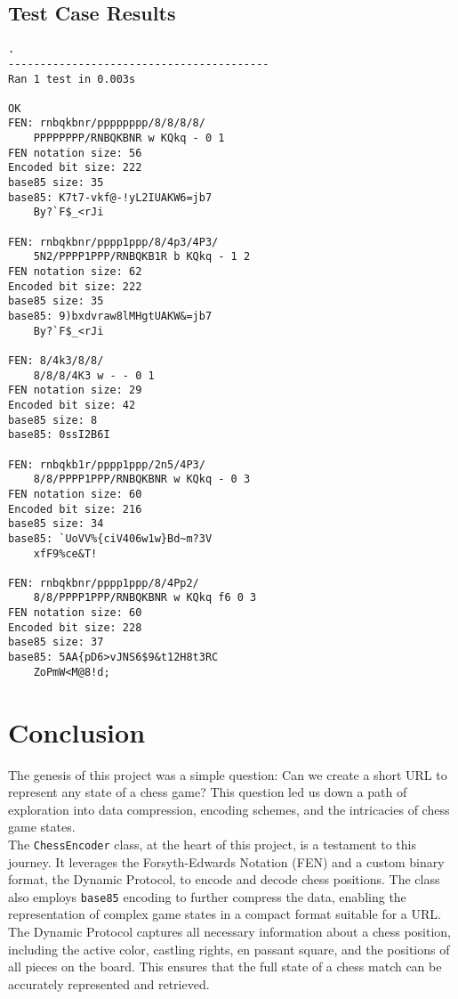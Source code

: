 \documentclass[journal]{journal}
\begin{document}
\subsection{Test Case Results}
\begin{verbatim}
.
-----------------------------------------
Ran 1 test in 0.003s

OK
FEN: rnbqkbnr/pppppppp/8/8/8/8/
    PPPPPPPP/RNBQKBNR w KQkq - 0 1
FEN notation size: 56
Encoded bit size: 222
base85 size: 35
base85: K7t7-vkf@-!yL2IUAKW6=jb7
    By?`F$_<rJi

FEN: rnbqkbnr/pppp1ppp/8/4p3/4P3/
    5N2/PPPP1PPP/RNBQKB1R b KQkq - 1 2
FEN notation size: 62
Encoded bit size: 222
base85 size: 35
base85: 9)bxdvraw8lMHgtUAKW&=jb7
    By?`F$_<rJi

FEN: 8/4k3/8/8/
    8/8/8/4K3 w - - 0 1
FEN notation size: 29
Encoded bit size: 42
base85 size: 8
base85: 0ssI2B6I

FEN: rnbqkb1r/pppp1ppp/2n5/4P3/
    8/8/PPPP1PPP/RNBQKBNR w KQkq - 0 3
FEN notation size: 60
Encoded bit size: 216
base85 size: 34
base85: `UoVV%{ciV406w1w}Bd~m?3V
    xfF9%ce&T!

FEN: rnbqkbnr/pppp1ppp/8/4Pp2/
    8/8/PPPP1PPP/RNBQKBNR w KQkq f6 0 3
FEN notation size: 60
Encoded bit size: 228
base85 size: 37
base85: 5AA{pD6>vJNS6$9&t12H8t3RC
    ZoPmW<M@8!d;

\end{verbatim}  

\newpage

\section{Conclusion}

The genesis of this project was a simple question: Can we create a short URL to represent any state of a chess game? This question led us down a path of exploration into data compression, encoding schemes, and the intricacies of chess game states. \\

The \verb|ChessEncoder| class, at the heart of this project, is a testament to this journey. It leverages the Forsyth-Edwards Notation (FEN) and a custom binary format, the Dynamic Protocol, to encode and decode chess positions. The class also employs \verb|base85| encoding to further compress the data, enabling the representation of complex game states in a compact format suitable for a URL. \\

The Dynamic Protocol captures all necessary information about a chess position, including the active color, castling rights, en passant square, and the positions of all pieces on the board. This ensures that the full state of a chess match can be accurately represented and retrieved.
\end{document}
